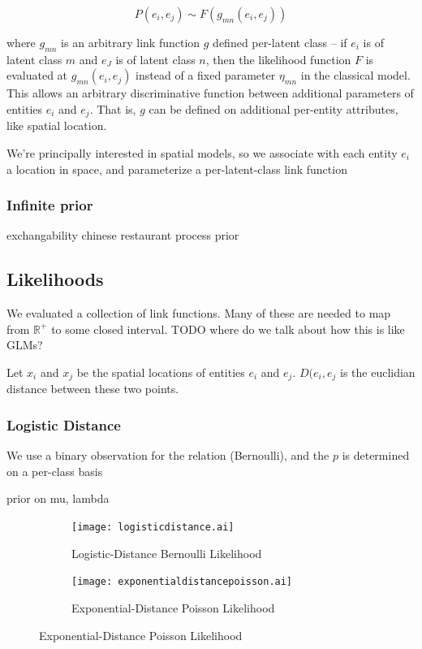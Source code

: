 \documentclass{article}
\begin{document}
\begin{equation}
P(e_i, e_j) \sim F(g_{mn}(e_i, e_j))
\end{equation}

where $g_{mn}$ is an arbitrary link function $g$ defined per-latent
class -- if $e_i$ is of latent class $m$ and $e_J$ is of latent class
$n$, then the likelihood function $F$ is evaluated at $g_{mn}(e_i,
e_j)$ instead of a fixed parameter $\eta_{mn}$ in the classical
model. This allows an arbitrary discriminative function between
additional parameters of entities $e_i$ and $e_j$. That is, $g$ can be
defined on additional per-entity attributes, like spatial location.

We're principally interested in spatial models, so we associate with each
entity $e_i$ a location in space, and parameterize a per-latent-class
link function 

\subsubsection{Infinite prior}
exchangability 
chinese restaurant process prior



\subsection{Likelihoods}
We evaluated a collection of link functions. 
Many of these are needed to map from $\mathbb{R}^+$ to some closed interval. 
TODO where do we talk about how this is like GLMs? 

Let $x_i$ and $x_j$ be the spatial locations of entities $e_i$ and $e_j$. $D(e_i, e_j$ is the euclidian distance between these two points. 
 
\subsubsection{Logistic Distance}
We use a binary observation for the relation (Bernoulli), and the $p$ is determined
on a per-class basis

prior on mu, lambda

\begin{figure}
  \centering 
  \begin{subfigure}[b]{0.4\textwidth}
    \texttt{[image: logisticdistance.ai]}
    \caption{Logistic-Distance Bernoulli Likelihood}
    \label{fig:gull}
  \end{subfigure}
  \begin{subfigure}[b]{0.4\textwidth}
    \texttt{[image: exponentialdistancepoisson.ai]}
    \caption{Exponential-Distance Poisson Likelihood}
    \label{fig:gull}
  \end{subfigure}

\end{figure}
\end{document}

